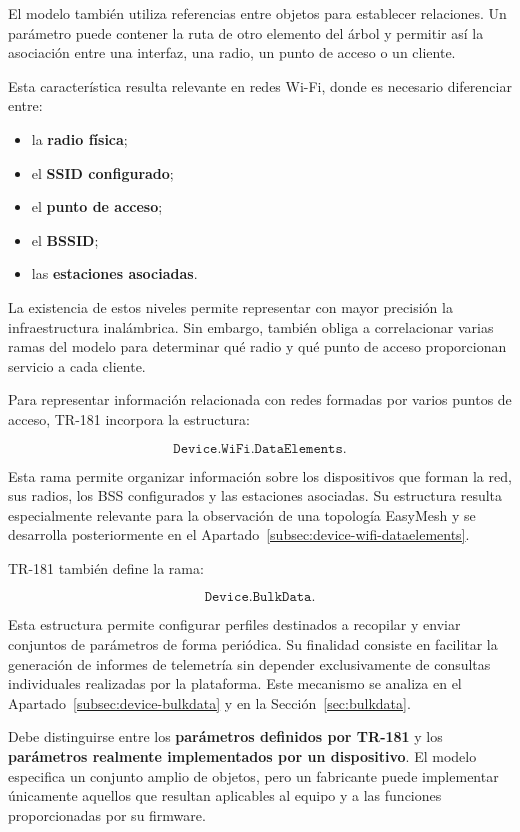 El modelo también utiliza referencias entre objetos para establecer
relaciones. Un parámetro puede contener la ruta de otro elemento del árbol
y permitir así la asociación entre una interfaz, una radio, un punto de
acceso o un cliente.

Esta característica resulta relevante en redes Wi-Fi, donde es necesario
diferenciar entre:

\begin{itemize}
    \item la \textbf{radio física};
    \item el \textbf{SSID configurado};
    \item el \textbf{punto de acceso};
    \item el \textbf{BSSID};
    \item las \textbf{estaciones asociadas}.
\end{itemize}

La existencia de estos niveles permite representar con mayor precisión la
infraestructura inalámbrica. Sin embargo, también obliga a correlacionar
varias ramas del modelo para determinar qué radio y qué punto de acceso
proporcionan servicio a cada cliente.

Para representar información relacionada con redes formadas por varios
puntos de acceso, TR-181 incorpora la estructura:

\[
    \texttt{Device.WiFi.DataElements.}
\]

Esta rama permite organizar información sobre los dispositivos que
forman la red, sus radios, los BSS configurados y las estaciones
asociadas. Su estructura resulta especialmente relevante para la
observación de una topología EasyMesh y se desarrolla posteriormente en
el Apartado~\ref{subsec:device-wifi-dataelements}.

TR-181 también define la rama:

\[
    \texttt{Device.BulkData.}
\]

Esta estructura permite configurar perfiles destinados a recopilar y
enviar conjuntos de parámetros de forma periódica. Su finalidad consiste
en facilitar la generación de informes de telemetría sin depender
exclusivamente de consultas individuales realizadas por la plataforma.
Este mecanismo se analiza en el
Apartado~\ref{subsec:device-bulkdata} y en la
Sección~\ref{sec:bulkdata}.

Debe distinguirse entre los
\textbf{parámetros definidos por TR-181} y los
\textbf{parámetros realmente implementados por un dispositivo}. El
modelo especifica un conjunto amplio de objetos, pero un fabricante puede
implementar únicamente aquellos que resultan aplicables al equipo y a
las funciones proporcionadas por su firmware.

